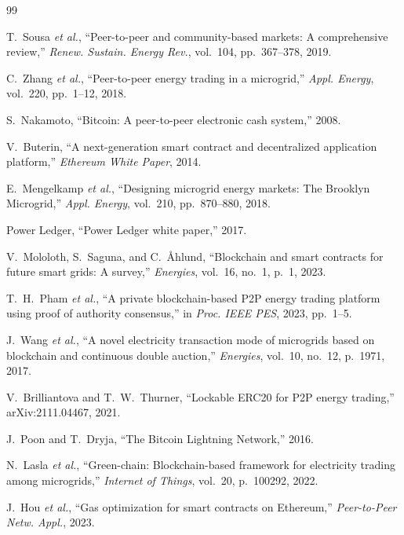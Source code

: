 \documentclass{IEEEoj}
\begin{document}
\begin{thebibliography}{99}

T.~Sousa \textit{et al.},
``Peer-to-peer and community-based markets: A comprehensive review,''
\textit{Renew. Sustain. Energy Rev.}, vol.~104, pp.~367--378, 2019.

C.~Zhang \textit{et al.},
``Peer-to-peer energy trading in a microgrid,''
\textit{Appl. Energy}, vol.~220, pp.~1--12, 2018.

S.~Nakamoto,
``Bitcoin: A peer-to-peer electronic cash system,'' 2008.

V.~Buterin,
``A next-generation smart contract and decentralized application platform,''
\textit{Ethereum White Paper}, 2014.

E.~Mengelkamp \textit{et al.},
``Designing microgrid energy markets: The Brooklyn Microgrid,''
\textit{Appl. Energy}, vol.~210, pp.~870--880, 2018.

Power Ledger, ``Power Ledger white paper,'' 2017.

V.~Mololoth, S.~Saguna, and C.~\AA{}hlund,
``Blockchain and smart contracts for future smart grids: A survey,''
\textit{Energies}, vol.~16, no.~1, p.~1, 2023.

T.~H.~Pham \textit{et al.},
``A private blockchain-based P2P energy trading platform using proof of
authority consensus,''
in \textit{Proc. IEEE PES}, 2023, pp.~1--5.

J.~Wang \textit{et al.},
``A novel electricity transaction mode of microgrids based on blockchain
and continuous double auction,''
\textit{Energies}, vol.~10, no.~12, p.~1971, 2017.

V.~Brilliantova and T.~W.~Thurner,
``Lockable ERC20 for P2P energy trading,''
arXiv:2111.04467, 2021.

J.~Poon and T.~Dryja,
``The Bitcoin Lightning Network,'' 2016.

N.~Lasla \textit{et al.},
``Green-chain: Blockchain-based framework for electricity trading among
microgrids,''
\textit{Internet of Things}, vol.~20, p.~100292, 2022.

J.~Hou \textit{et al.},
``Gas optimization for smart contracts on Ethereum,''
\textit{Peer-to-Peer Netw. Appl.}, 2023.

\end{thebibliography}
\end{document}
